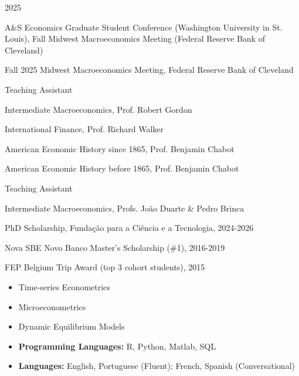 \documentclass{practical-resume}
\begin{document}

	\begin{position}{2025}{}
		\item A\&S Economics Graduate Student Conference (Washington University in St. Louis), Fall Midwest Macroeconomics Meeting (Federal Reserve Bank of Cleveland)
		\item Fall 2025 Midwest Macroeconomics Meeting, Federal Reserve Bank of Cleveland 
	\end{position}


	\begin{position}{Teaching Assistant}{}
		\item Intermediate Macroeconomics, Prof. Robert Gordon
		\item International Finance, Prof. Richard Walker
		\item American Economic History since 1865, Prof. Benjamin Chabot
		\item American Economic History before 1865, Prof. Benjamin Chabot
	\end{position}
	
	\begin{position}{Teaching Assistant}{}
		\item Intermediate Macroeconomics, Profs. João Duarte \& Pedro Brinca
	\end{position}

\begin{position}{}{}{}
	\item PhD Scholarship, Fundação para a Ciência e a Tecnologia, 2024-2026
	\item Nova SBE Novo Banco Master's Scholarship (\#1), 2016-2019
	\item FEP Belgium Trip Award (top 3 cohort students), 2015
\end{position}
	
\vspace{-1em}
	
	\begin{itemize}
		\item Time-series Econometrics
		
		\item Microeconometrics

		\item Dynamic Equilibrium Models	
	
		\item \textbf{Programming Languages:} R, Python, Matlab, SQL
	
		\item \textbf{Languages:} English, Portuguese (Fluent); French, Spanish (Conversational)

	\end{itemize}
		
\end{document}
